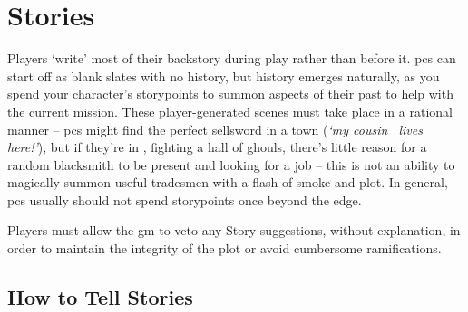 \chapter[House of Stories]{Stories}
\label{stories}

Players `write' most of their backstory during play rather than before it.
\Glspl{pc} can start off as blank slates with no history, but history emerges naturally, as you spend your character's \glspl{storypoint} to summon aspects of their past to help with the current mission.
These player-generated scenes must take place in a rational manner -- \glspl{pc} might find the perfect sellsword in a town (\textit{`my cousin \composeHumanName\ lives here!'}), but if they're in , fighting a hall of ghouls, there's little reason for a random blacksmith to be present and looking for a job -- this is not an ability to magically summon useful tradesmen with a flash of smoke and plot.
In general, \glspl{pc} usually should not spend \glspl{storypoint} once beyond the \gls{edge}.

Players must allow the \gls{gm} to veto any Story suggestions, without explanation, in order to maintain the integrity of the plot or avoid cumbersome ramifications.

\section{How to Tell Stories}
\label{listOfStories}

